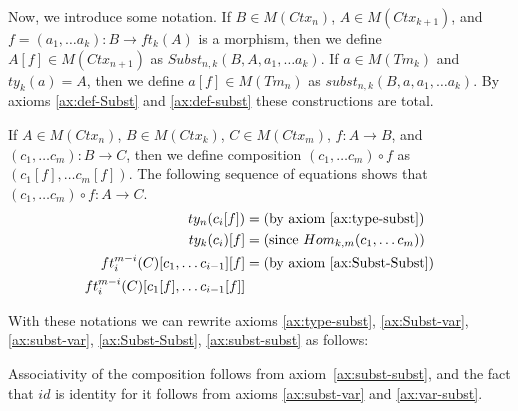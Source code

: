 \documentclass[reqno]{amsart}
\theoremstyle{definition}
\theoremstyle{remark}
\numberwithin{figure}{section}
\begin{document}
Now, we introduce some notation.
If $B \in M(Ctx_n)$, $A \in M(Ctx_{k+1})$, and $f = (a_1, \ldots a_k) : B \to ft_k(A)$ is a morphism, then we define $A[f] \in M(Ctx_{n+1})$ as $Subst_{n,k}(B, A, a_1, \ldots a_k)$.
If $a \in M(Tm_k)$ and $ty_k(a) = A$, then we define $a[f] \in M(Tm_n)$ as $subst_{n,k}(B, a, a_1, \ldots a_k)$.
By axioms \eqref{ax:def-Subst} and \eqref{ax:def-subst} these constructions are total.

If $A \in M(Ctx_n)$, $B \in M(Ctx_k)$, $C \in M(Ctx_m)$, $f : A \to B$, and $(c_1, \ldots c_m) : B \to C$, then we define composition $(c_1, \ldots c_m) \circ f$ as $(c_1[f], \ldots c_m[f])$.
The following sequence of equations shows that $(c_1, \ldots c_m) \circ f : A \to C$.
\begin{align*}
ty_n(c_i[f]) & = \text{(by axiom~\eqref{ax:type-subst})} \\
ty_k(c_i)[f] & = \text{(since $Hom_{k,m}(c_1, \ldots c_m)$)} \\
ft^{m-i}_i(C)[c_1, \ldots c_{i-1}][f] & = \text{(by axiom~\eqref{ax:Subst-Subst})} \\
ft^{m-i}_i(C)[c_1[f], \ldots c_{i-1}[f]] &
\end{align*}

With these notations we can rewrite axioms \eqref{ax:type-subst}, \eqref{ax:Subst-var}, \eqref{ax:subst-var}, \eqref{ax:Subst-Subst}, \eqref{ax:subst-subst} as follows:
\begin{comment}
\begin{align}
\setcounter{equation}{\ref{ax:type-subst}}
\addtocounter{equation}{-1}
ty_n(a[f]) & = A[f] \\ \notag
\text{ for each } f : B \to ft_k(A) & \text{ where } A = ty_k(a) \\
A[id_{ft_n(A)}] & = A \\
a[id_{ft_n(ty_n(a))}] & = a \\
\setcounter{equation}{\ref{ax:Subst-Subst}}
\addtocounter{equation}{-1}
A[g][f] & = A[g \circ f] \\ \notag
\text{ for each } f : C \to B \text{ and } & g : B \to ft_m(A) \\
a[g][f] & = a[g \circ f] \\ \notag
\text{ for each } f : C \to B \text{ and } & g : B \to ft_m(ty_m(a))
\end{align}
\end{comment}

Associativity of the composition follows from axiom~\eqref{ax:subst-subst}, and the fact that $id$ is identity for it follows from axioms \eqref{ax:subst-var} and \eqref{ax:var-subst}.
\end{document}
